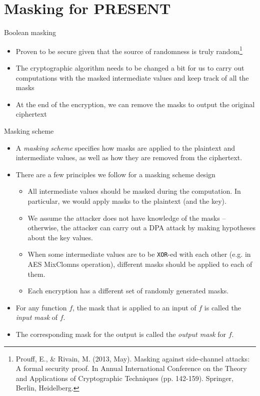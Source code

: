 \section{Masking for PRESENT}
\begin{frame}{\VideoName}
    \tableofcontents[currentsection]
\end{frame}

\begin{frame}{Boolean masking}
    \begin{itemize}
        \item Proven to be secure given that the source of randomness is truly random\footnote{Prouff, E., \& Rivain, M. (2013, May). Masking against side-channel attacks: A formal security proof. In Annual International Conference on the Theory and Applications of Cryptographic Techniques (pp. 142-159). Springer, Berlin, Heidelberg.}
        \item The cryptographic algorithm needs to be changed a bit for us to carry out computations with the masked intermediate values and keep track of all the masks
        \item At the end of the encryption, we can remove the masks to output the original ciphertext
    \end{itemize}
\end{frame}

\begin{frame}{Masking scheme}
    \begin{itemize}
        \item A \textit{masking scheme} specifies how masks are applied to the plaintext and intermediate values, as well as how they are removed from the ciphertext.
        \item There are a few principles we follow for a masking scheme design
        \begin{itemize}
             \item All intermediate values should be masked during the computation.
     In particular, we would apply masks to the plaintext (and the key).
    \item We assume the attacker does not have knowledge of the masks -- otherwise, the attacker can carry out a DPA attack by making hypotheses about the key values.
    \item When some intermediate values are to be \texttt{XOR}-ed with each other (e.g. in AES MixClomns operation), different masks should be applied to each of them.
    \item Each encryption has a different set of randomly generated masks.
        \end{itemize}
        \item For any function $f$, the mask that is applied to an input of $f$ is called the \textit{input mask} of $f$.
        \item The corresponding mask for the output is called the \textit{output mask} for $f$.
    \end{itemize}
\end{frame}


